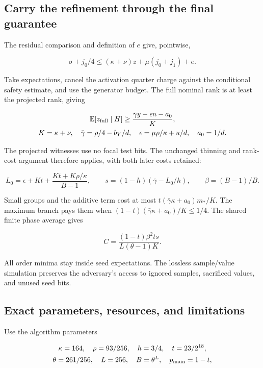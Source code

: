 \documentclass[11pt]{article}
\begin{document}
\subsection{Carry the refinement through the final guarantee}\label{carry-the-refinement-through-the-final-guarantee}

The residual comparison and definition of \(e\) give, pointwise,

\[\sigma+j_0/4\le(\kappa+\nu)z+\mu(j_0+j_1)+e.\]

Take expectations, cancel the activation quarter charge against the conditional safety estimate, and use the generator budget. The full nominal rank is at least the projected rank, giving

\[\begin{gathered}
\mathbb E[z_{\rm full}\mid H]\ge
\frac{\bar\gamma y-\epsilon n-a_0}{K},\\
K=\kappa+\nu,\quad\bar\gamma=\rho/4-b_Y/d,\quad
\epsilon=\mu\rho/\kappa+u/d,\quad a_0=1/d.
\end{gathered}\]

The projected witnesses use no focal test bits. The unchanged thinning and rank-cost argument therefore applies, with both later costs retained:

\[L_0=\epsilon+Kt+\frac{Kt+K\rho/\kappa}{B-1},\qquad
s=(1-h)(\bar\gamma-L_0/h),\qquad\beta=(B-1)/B.\]

Small groups and the additive term cost at most \(t(\bar\gamma\kappa+a_0)m_*/K\). The maximum branch pays them when \((1-t)(\bar\gamma\kappa+a_0)/K\le1/4\). The shared finite phase average gives

\[C=\frac{(1-t)\beta^2 t s}{L(\theta-1)K}.\]

All order minima stay inside seed expectations. The lossless sample/value simulation preserves the adversary's access to ignored samples, sacrificed values, and unused seed bits.

\subsection{Exact parameters, resources, and limitations}\label{exact-parameters-resources-and-limitations}

Use the algorithm parameters

\[\begin{gathered}
\kappa=164,\quad\rho=93/256,\quad h=3/4,\quad t=23/2^{18},\\
\theta=261/256,\quad L=256,\quad B=\theta^L,\quad p_{\rm main}=1-t,
\end{gathered}\]
\end{document}
